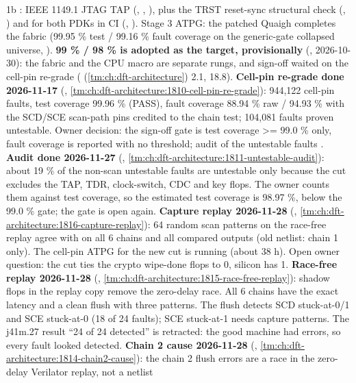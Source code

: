 \begin{record}
\begin{enumerate}
  1b \ok{}: IEEE 1149.1 JTAG TAP (, , ), plus the TRST reset-sync structural check (, ) and  for both PDKs in CI
  (, ). Stage 3 ATPG: the patched Quaigh completes
  the fabric (99.95 \% test / 99.16 \% fault coverage on the
  generic-gate collapsed universe, ). \textbf{99 \% / 98
  \% is adopted as the target, provisionally} (,
  2026-10-30): the fabric and the CPU macro are separate rungs, and
  sign-off waited on the cell-pin re-grade 
  ( (\cref{tm:ch:dft-architecture}) 2.1, 18.8).
  \textbf{Cell-pin re-grade done 2026-11-17} (,
  \cref{tm:ch:dft-architecture:1810-cell-pin-re-grade}): 944,122
  cell-pin faults, test coverage 99.96 \% (PASS), fault coverage
  88.94 \% raw / 94.93 \% with the SCD/SCE scan-path pins credited to
  the chain test; 104,081 faults proven untestable. Owner decision: the
  sign-off gate is test coverage \textgreater= 99.0 \% only, fault
  coverage is reported with no threshold; audit of the untestable faults
  . \textbf{Audit done 2026-11-27} (,
  \cref{tm:ch:dft-architecture:1811-untestable-audit}): about 19 \% of
  the non-scan untestable faults are untestable only because the cut
  excludes the TAP, TDR, clock-switch, CDC and key flops. The owner
  counts them against test coverage, so the estimated test coverage is
  98.97 \%, below the 99.0 \% gate; the gate is open again.
  \textbf{Capture replay 2026-11-28} (,
  \cref{tm:ch:dft-architecture:1816-capture-replay}): 64 random scan
  patterns on the race-free replay agree with  on
  all 6 chains and all compared outputs (old netlist: chain 1 only). The
  cell-pin ATPG for the new cut is running (about 38 h). Open owner
  question: the cut ties the crypto wipe-done flops to 0, silicon has 1.
  \textbf{Race-free replay 2026-11-28} (,
  \cref{tm:ch:dft-architecture:1815-race-free-replay}): shadow flops in
  the replay copy remove the zero-delay race. All 6 chains have the exact
  latency and a clean flush with three patterns. The flush detects SCD
  stuck-at-0/1 and SCE stuck-at-0 (18 of 24 faults); SCE stuck-at-1 needs
  capture patterns. The j41m.27 result ``24 of 24 detected'' is retracted:
  the good machine had errors, so every fault looked detected.
  \textbf{Chain 2 cause 2026-11-28} (,
  \cref{tm:ch:dft-architecture:1814-chain2-cause}): the chain 2 flush
  errors are a race in the zero-delay Verilator replay, not a netlist

\end{enumerate}
\end{record}
